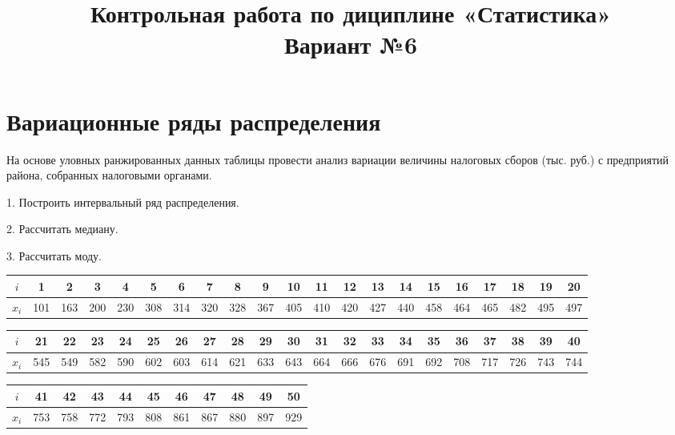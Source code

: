\documentclass[fleqn]{article}
\title{Контрольная работа по дициплине «Статистика»\\
Вариант №6}
\begin{document}
\date{}
\maketitle
\section*{Вариационные ряды распределения}

На основе уловных ранжированных данных таблицы провести анализ вариации величины налоговых сборов (тыс. руб.) с предприятий района, собранных налоговыми органами.

1. Построить интервальный ряд распределения.

2. Рассчитать медиану.

3. Рассчитать моду.

\bgroup
\def\arraystretch{1.5}
\setlength{}
\begin{center}
\begin{tabular}{|c|c|c|c|c|c|c|c|c|c|c|c|c|c|c|c|c|c|c|c|c|}
\hline
$i$ & 1 & 2 & 3 & 4 & 5 & 6 & 7 & 8 & 9 & 10 & 11 & 12 & 13 & 14 & 15 & 16 & 17 & 18 & 19 & 20 \\
\hline
$x_i$ & 101 & 163 & 200 & 230 & 308 & 314 & 320 & 328 & 367 & 405 & 410 & 420 & 427 & 440 & 458 & 464 & 465 & 482 & 495 & 497 \\
\hline
\end{tabular}
\end{center}

\begin{center}
\begin{tabular}{|c|c|c|c|c|c|c|c|c|c|c|c|c|c|c|c|c|c|c|c|c|}
\hline
$i$ & 21 & 22 & 23 & 24 & 25 & 26 & 27 & 28 & 29 & 30 & 31 & 32 & 33 & 34 & 35 & 36 & 37 & 38 & 39 & 40 \\
\hline
$x_i$ & 545 & 549 & 582 & 590 & 602 & 603 & 614 & 621 & 633 & 643 & 664 & 666 & 676 & 691 & 692 & 708 & 717 & 726 & 743 & 744 \\
\hline
\end{tabular}
\end{center}

\begin{center}
\begin{tabular}{|c|c|c|c|c|c|c|c|c|c|c|}
\hline
$i$ & 41 & 42 & 43 & 44 & 45 & 46 & 47 & 48 & 49 & 50 \\
\hline
$x_i$ & 753 & 758 & 772 & 793 & 808 & 861 & 867 & 880 & 897 & 929 \\
\hline
\end{tabular}
\end{center}
\egroup
\end{document}

